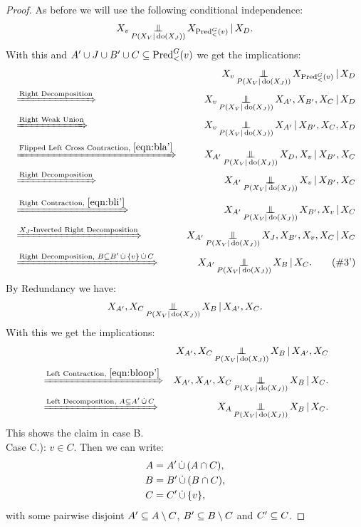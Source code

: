 \begin{Thm}
\begin{proof}
As before we will use the following conditional independence:
\[ X_v \operatorname*{\perp\mkern-11mu\perp}_{P(X_V|\operatorname{do}(X_J))}  X_{\mathrm{Pred}^G_<(v)} \operatorname*{|} X_D. \]
With this and $A' \cup J \cup B' \cup C \subseteq \mathrm{Pred}^G_<(v)$ we get the implications:
\begin{align*}
   && X_v \Indep_{P(X_V|\doit(X_J))} X_{\Pred^G_<(v)} \given X_D \\
    &\xRightarrow{\text{Right Decomposition}} & X_v \Indep_{P(X_V|\doit(X_J))} X_{A'},X_{B'},X_C \given X_D\\
& \xRightarrow{\text{Right Weak Union}}  &  X_v \Indep_{P(X_V|\doit(X_J))} X_{A'} \given X_{B'},X_C,X_D\\
& \xRightarrow{\text{Flipped Left Cross Contraction, }\eqref{eqn:bla'}}  
& X_{A'}  \Indep_{P(X_V|\doit(X_J))} X_D,X_v \given X_{B'},X_C \\
& \xRightarrow{\text{Right Decomposition}}  
& X_{A'}  \Indep_{P(X_V|\doit(X_J))} X_v \given X_{B'},X_C \\
& \xRightarrow{\text{Right Contraction, }\eqref{eqn:bli'}}  
& X_{A'}  \Indep_{P(X_V|\doit(X_J))} X_{B'},X_v \given X_C \\
& \xRightarrow{\text{$X_J$-Inverted Right Decomposition}}  & X_{A'}  \Indep_{P(X_V|\doit(X_J))} X_J,X_{B'},X_v,X_C \given X_C \\
& \xRightarrow{\text{Right Decomposition, } B \ins B'\dcup \{v\} \dcup C}  & X_{A'}  \Indep_{P(X_V|\doit(X_J))} X_B \given X_C.  \label{eqn:bloop'} \tag{\#3'}
\end{align*}
By Redundancy we have:
\[ X_{A'}, X_C \operatorname*{\perp\mkern-11mu\perp}_{P(X_V|\operatorname{do}(X_J))}  X_B \operatorname*{|} X_{A'},X_C. \]
With this we get the implications:
\begin{align*}
&&X_{A'}, X_C \Indep_{P(X_V|\doit(X_J))}  X_B \given X_{A'},X_C\\
& \xRightarrow{\text{Left Contraction, } \eqref{eqn:bloop'}}  &  
X_{A'},X_{A'}, X_C \Indep_{P(X_V|\doit(X_J))}  X_B \given X_C.\\
& \xRightarrow{\text{Left Decomposition, } A \ins A' \dcup C}  &    
X_A \Indep_{P(X_V|\doit(X_J))}  X_B \given X_C. 
\end{align*}
This shows the claim in case B.\\


Case C.): $v \in C$.
 Then we can write:
\begin{align*}
    A &= A' \,\dot{\cup}\, (A \cap C), \\
    B &= B' \,\dot{\cup}\, (B \cap C),\\
    C &= C' \,\dot{\cup}\, \{v\},
\end{align*}
with some pairwise disjoint $A' \subseteq A \setminus C$, 
$B' \subseteq B \setminus C$ and
$C' \subseteq C$.


\end{proof}
\end{Thm}
